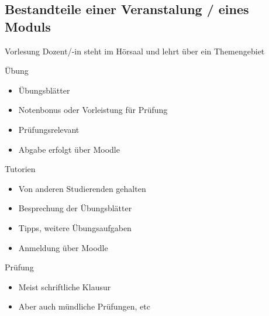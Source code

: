 \documentclass[
	aspectratio=169, 
	10pt 
]{beamer}
\begin{document}
\subsection{Bestandteile einer Veranstalung / eines Moduls}
\begin{frame}{\insertsubsection}
    \begin{fancycolumns}[columns=2]
        \begin{definition}{Vorlesung}
            Dozent/-in steht im Hörsaal und lehrt über ein Themengebiet
        \end{definition}
        
        \begin{definition}{Übung}
            \begin{itemize}
                \item Übungsblätter
                \item Notenbonus oder Vorleistung für Prüfung
                \item Prüfungsrelevant
                \item Abgabe erfolgt über Moodle
            \end{itemize}
        \end{definition}
        
        \nextcolumn
        \begin{definition}{Tutorien}
            \begin{itemize}
                \item Von anderen Studierenden gehalten
                \item Besprechung der Übungsblätter 
                \item Tipps, weitere Übungsaufgaben
                \item Anmeldung über Moodle
            \end{itemize}
        \end{definition}

        \begin{definition}{Prüfung}
            \begin{itemize}
                \item Meist schriftliche Klausur
                \item Aber auch mündliche Prüfungen, etc
            \end{itemize}
        \end{definition}

    \end{fancycolumns}

\end{frame}
\end{document}
